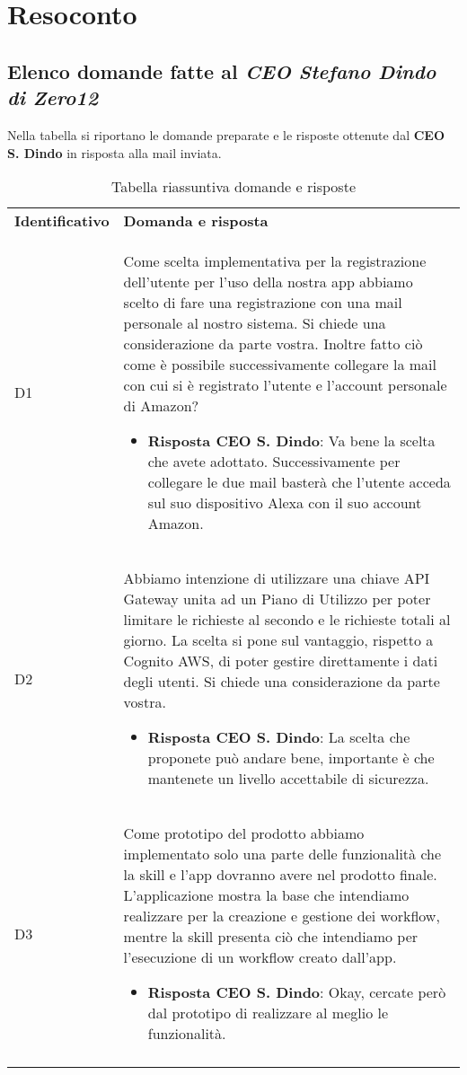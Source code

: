 \clearpage
\section{Resoconto}
	\subsection{Elenco domande fatte al \emph{CEO Stefano Dindo di Zero12}}
	Nella tabella si riportano le domande preparate e le risposte ottenute dal \textbf{CEO S. Dindo} in risposta alla mail inviata.
		\begin{center}
			\renewcommand{\arraystretch}{1.5}
			\begin{longtable}{  p{2.5cm} p{11.7cm} }
				\rowcolor{tableHeadYellow}
				\textbf{Identificativo}&\textbf{Domanda e risposta}\\
				D1 & Come scelta implementativa per la registrazione dell'utente per l'uso della nostra app abbiamo scelto di fare una registrazione con una mail personale al nostro sistema. Si chiede una considerazione da parte vostra. Inoltre fatto ciò come è possibile successivamente collegare la mail con cui si è registrato l'utente e l'account personale di Amazon?
				\begin{itemize}
					\item \textbf{Risposta CEO S. Dindo}: Va bene la scelta che avete adottato. Successivamente per collegare le due mail basterà che l'utente acceda sul suo dispositivo Alexa con il suo account Amazon.
				\end{itemize}
				\\
				D2 & Abbiamo intenzione di utilizzare una chiave API Gateway unita ad un Piano di Utilizzo per poter limitare le richieste al secondo e le richieste totali al giorno. La scelta si pone sul vantaggio, rispetto a Cognito AWS, di poter gestire direttamente i dati degli utenti. Si chiede una considerazione da parte vostra.
				\begin{itemize}
					\item \textbf{Risposta CEO S. Dindo}: La scelta che proponete può andare bene, importante è che mantenete un livello accettabile di sicurezza.
				\end{itemize}
				\\
				D3 & Come prototipo del prodotto abbiamo implementato solo una parte delle funzionalità che la skill e l'app dovranno avere nel prodotto finale. L'applicazione mostra la base che intendiamo realizzare per la creazione e gestione dei workflow, mentre la skill presenta ciò che intendiamo per l'esecuzione di un workflow creato dall'app.
				\begin{itemize}
					\item \textbf{Risposta CEO S. Dindo}: Okay, cercate però dal prototipo di realizzare al meglio le funzionalità.
				\end{itemize}
				\\
				\rowcolor{white}
				\caption{Tabella riassuntiva domande e risposte}
			\end{longtable}	
		\end{center}
	
	
